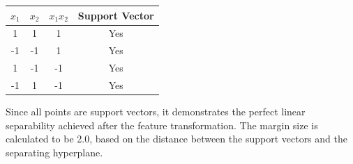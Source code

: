 \documentclass[11pt]{article}
\begin{document}
	\begin{center}
		\begin{tabular}{|c|c|c|c|}
			\hline
			$x_{1}$ & $x_{2}$ & $x_{1} x_{2}$ & Support Vector \\
			\hline
			1 & 1 & 1 & Yes \\
			-1 & -1 & 1 & Yes \\
			1 & -1 & -1 & Yes \\
			-1 & 1 & -1 & Yes \\
			\hline
		\end{tabular}
	\end{center}
	
	Since all points are support vectors, it demonstrates the perfect linear separability achieved after the feature transformation. The margin size is calculated to be 2.0, based on the distance between the support vectors and the separating hyperplane.
	
\end{document}
